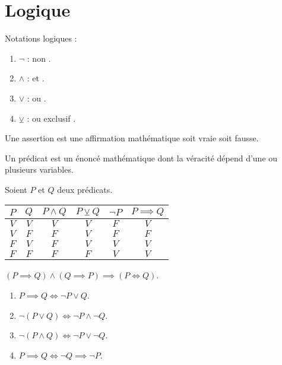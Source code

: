 \chapter{Logique}
\noindent Notations logiques :
\begin{enumerate}
	\item $\neg$ : \og non \fg.
	\item $\land$ : \og et \fg.
	\item $\lor$ : \og ou \fg.
	\item $\veebar$ : \og ou exclusif \fg.
\end{enumerate}

\begin{definition}[Assertion]
  Une assertion est une affirmation mathématique soit vraie soit fausse.
\end{definition}

\begin{definition}[Prédicat]
  Un prédicat est un énoncé mathématique dont la véracité dépend d'une ou plusieurs variables.
\end{definition}

\begin{proposition}
  Soient $P$ et $Q$ deux prédicats.
  \begin{table}[!h]
    \centering
    \begin{tabular}{cccccc}
      \toprule
      $P$ & $Q$ & $P \land Q$ & $P \veebar Q$ & $\neg P$ & $P \implies Q$ \\
      \midrule
      $V$ & $V$ & $V$ & $V$ & $F$ & $V$ \\
      $V$ & $F$ & $F$ & $V$ & $F$ & $F$ \\
      $F$ & $V$ & $F$ & $V$ & $V$ & $V$ \\
      $F$ & $F$ & $F$ & $F$ & $V$ & $V$ \\
      \bottomrule
    \end{tabular}
  \end{table}
  
  \noindent $(P \implies Q) \land (Q \implies P) \implies (P \iff Q)$.
  \begin{multicols}{2}
	\begin{enumerate} 
		\item $P \implies Q \iff \neg P \lor Q$.
		\item $\neg (P \lor Q) \iff \neg P \land \neg Q$.
		\item $\neg (P \land Q) \iff \neg P \lor \neg Q$.
		\item $P \implies Q \iff \neg Q \implies \neg P$.
	\end{enumerate}
  \end{multicols}
\end{proposition}

